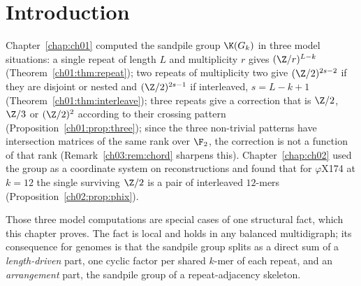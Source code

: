 \section{Introduction}\label{ch03:sec:intro}

Chapter~\ref{chap:ch01} computed the sandpile group $\K(G_k)$ in three model situations: a
single repeat of length $L$ and multiplicity $r$ gives $(\Z/r)^{L-k}$
(Theorem~\ref{ch01:thm:repeat}); two repeats of multiplicity two give $(\Z/2)^{2s-2}$ if they
are disjoint or nested and $(\Z/2)^{2s-1}$ if interleaved, $s=L-k+1$
(Theorem~\ref{ch01:thm:interleave}); three repeats give a correction that is $\Z/2$, $\Z/3$ or
$(\Z/2)^{2}$ according to their crossing pattern (Proposition~\ref{ch01:prop:three}); since the
three non-trivial patterns have intersection matrices of the same rank over $\F_2$, the
correction is not a function of that rank (Remark~\ref{ch03:rem:chord} sharpens this).
Chapter~\ref{chap:ch02} used the group as a coordinate system on reconstructions and found that
for $\varphi$X174 at $k=12$ the single surviving $\Z/2$ is a pair of interleaved $12$-mers
(Proposition~\ref{ch02:prop:phix}).

Those three model computations are special cases of one structural fact, which this chapter
proves. The fact is local and holds in any balanced multidigraph; its consequence for
genomes is that the sandpile group splits as a direct sum of a \emph{length-driven} part,
one cyclic factor per shared $k$-mer of each repeat, and an \emph{arrangement} part, the
sandpile group of a repeat-adjacency skeleton.

